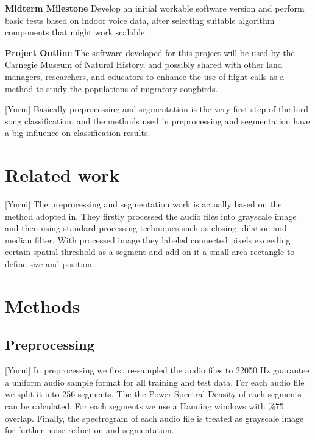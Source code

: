 \documentclass{article} %
\begin{document}
{\bf Midterm Milestone} Develop an initial workable software version and perform basic tests based on indoor voice data, after selecting suitable algorithm components that might work scalable.

{\bf Project Outline} The software developed for this project will be used by the Carnegie Museum of Natural History, and possibly shared with other land managers, researchers, and educators to enhance the use of flight calls as a method to study the populations of migratory songbirds. %

[Yurui] Basically preprocessing and segmentation is the very first step of the bird song classification, and the methods used in preprocessing and segmentation have a big influence on classification results.


\section{Related work}
[Yurui] The preprocessing and segmentation work is actually based on the method adopted in\cite{Lasseck13}. They firstly processed the audio files into grayscale image and then using standard processing techniques such as closing, dilation and median filter. With processed image they labeled connected pixels exceeding certain spatial threshold as a segment and add on it a small area rectangle to define size and position.

\section{Methods}

\subsection{Preprocessing}
[Yurui] In preprocessing we first re-sampled the audio files to 22050 Hz guarantee a uniform audio sample format for all training and test data. For each audio file we split it into 256 segments. The the Power Spectral Density of each segments can be calculated. For each segments we use a Hanning windows with \%75 overlap. Finally, the spectrogram of each audio file is treated as grayscale image for further noise reduction and segmentation.
\end{document}
